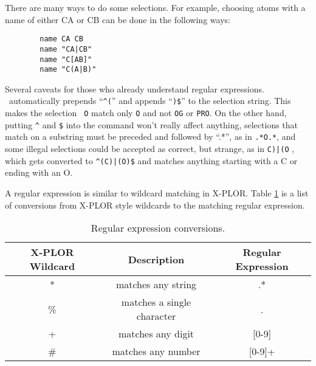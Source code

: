 There are many ways to do some selections.  For example, choosing
atoms with a name of either CA or CB can be done in the following ways:

\begin{verbatim}
        name CA CB
        name "CA|CB"
        name "C[AB]"
        name "C(A|B)"
\end{verbatim}

Several caveats for those who already understand regular expressions.
\VMD\ automatically prepends ``\verb!^(!'' and appends
``\verb!)$!'' to the selection string.  This makes the selection {\tt
O} match only {\tt O} and not {\tt OG} or {\tt PRO}.  On the other
hand, putting \verb!^!  and \verb!$! into the command won't really
affect anything, selections that match on a substring must be
preceded and followed by ``.*'', as in \verb!.*O.*!, and some illegal
selections could be accepted as correct, but strange, as in
\verb!C)|(O!
, which gets converted to
\verb!^(C)|(O)$!
and matches anything starting with a C or ending with an O.

A regular expression is similar to wildcard matching in X-PLOR.  Table
\ref{table:ug:conversions} is a list of conversions from X-PLOR style
wildcards to the matching regular expression.

\begin{table}[htb]
\hspace{1.1in}
\begin{tabular}{|c|c|c|} \hline
X-PLOR Wildcard & Description & Regular Expression \\ 
\hline\hline
*               & matches any string         & .*         \\
\%              & matches a single character & .          \\
+               & matches any digit          & [0-9]      \\
\#              & matches any number         & [0-9]+     \\ 
\hline
\end{tabular}
\caption{Regular expression conversions.}
\label{table:ug:conversions}
\end{table}


